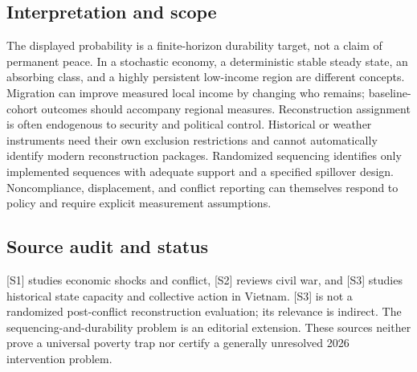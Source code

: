 \documentclass[11pt,a4paper]{article}
\begin{document}
\subsection*{Interpretation and scope}
The displayed probability is a finite-horizon durability target, not a claim of permanent peace. In a stochastic economy, a deterministic stable steady state, an absorbing class, and a highly persistent low-income region are different concepts. Migration can improve measured local income by changing who remains; baseline-cohort outcomes should accompany regional measures. Reconstruction assignment is often endogenous to security and political control. Historical or weather instruments need their own exclusion restrictions and cannot automatically identify modern reconstruction packages. Randomized sequencing identifies only implemented sequences with adequate support and a specified spillover design. Noncompliance, displacement, and conflict reporting can themselves respond to policy and require explicit measurement assumptions.
\subsection*{Source audit and status}
[S1] studies economic shocks and conflict, [S2] reviews civil war, and [S3] studies historical state capacity and collective action in Vietnam. [S3] is not a randomized post-conflict reconstruction evaluation; its relevance is indirect. The sequencing-and-durability problem is an editorial extension. These sources neither prove a universal poverty trap nor certify a generally unresolved 2026 intervention problem.
\end{document}
